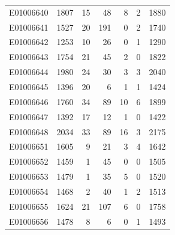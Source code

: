 \documentclass[
  letterpaper,
  DIV=11,
  numbers=noendperiod]{scrreprt}
\begin{document}
\begin{tabular}{lrrrrrr}
E01006640     &    1807 &      15 &                    48 &                               8 &                       2 &              1880 \\
E01006641     &    1527 &      20 &                   191 &                               0 &                       2 &              1740 \\
E01006642     &    1253 &      10 &                    26 &                               0 &                       1 &              1290 \\
E01006643     &    1754 &      21 &                    45 &                               2 &                       0 &              1822 \\
E01006644     &    1980 &      24 &                    30 &                               3 &                       3 &              2040 \\
E01006645     &    1396 &      20 &                     6 &                               1 &                       1 &              1424 \\
E01006646     &    1760 &      34 &                    89 &                              10 &                       6 &              1899 \\
E01006647     &    1392 &      17 &                    12 &                               1 &                       0 &              1422 \\
E01006648     &    2034 &      33 &                    89 &                              16 &                       3 &              2175 \\
E01006651     &    1605 &       9 &                    21 &                               3 &                       4 &              1642 \\
E01006652     &    1459 &       1 &                    45 &                               0 &                       0 &              1505 \\
E01006653     &    1479 &       1 &                    35 &                               5 &                       0 &              1520 \\
E01006654     &    1468 &       2 &                    40 &                               1 &                       2 &              1513 \\
E01006655     &    1624 &      21 &                   107 &                               6 &                       0 &              1758 \\
E01006656     &    1478 &       8 &                     6 &                               0 &                       1 &              1493 \\

\end{tabular}
\end{document}
